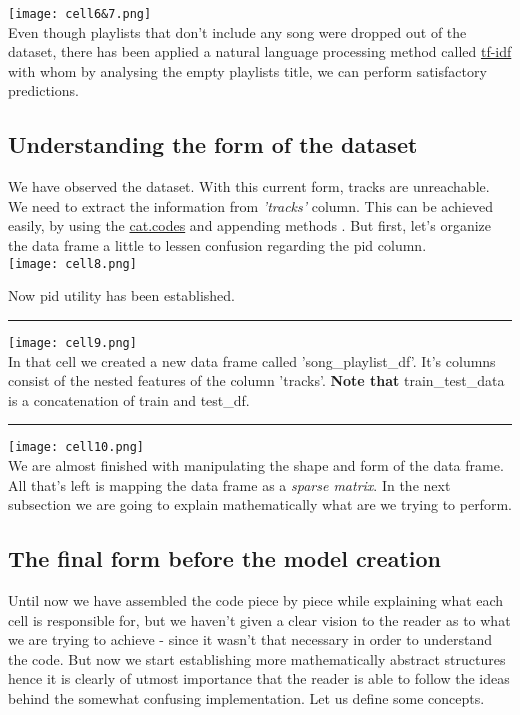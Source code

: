 \documentclass[]{article}
\begin{document}
\texttt{[image: cell6\&7.png]}
\\
Even though playlists that don't include any song were dropped out of the dataset, there has been applied a natural language processing method called \href{https://monkeylearn.com/blog/what-is-tf-idf/}{tf-idf} with whom by analysing the empty playlists title, we can perform satisfactory predictions.
\subsection{Understanding the form of the dataset}
We have observed the dataset. With this current form, tracks are unreachable. We need to extract the information from \textit{'tracks'} column. This can be achieved easily, by using the \href{https://stackoverflow.com/questions/30510562/get-mapping-of-categorical-variables-in-pandas/30513726}{cat.codes} and appending methods . But first, let's organize the data frame a little to lessen confusion regarding the pid column. 
\\
\texttt{[image: cell8.png]}

Now pid utility has been established.
\\
\noindent
{\color{Blue} \rule{\linewidth}{0.5mm}}
\texttt{[image: cell9.png]}
\\
In that cell we created a new data frame called 'song\_playlist\_df'. It's columns consist of the nested features of the column 'tracks'. \textbf{Note that} train\_test\_data is a concatenation of train and test\_df. 
\\ 
\noindent
{\color{Blue} \rule{\linewidth}{0.5mm}}
\texttt{[image: cell10.png]}
\\
We are almost finished with manipulating the shape and form of the data frame. All that's left is mapping the data frame as a \textit{sparse matrix}. In the next subsection we are going to explain mathematically what are we trying to perform.

\subsection{The final form before the model creation}

Until now we have assembled the code piece by piece while explaining what each cell is responsible for, but we haven't given a clear vision to the reader as to what we are trying to achieve - since it wasn't that necessary in order to understand the code. But now we start establishing more mathematically abstract structures hence it is clearly of utmost importance that the reader is able to follow the ideas behind the somewhat confusing implementation. Let us define some concepts. 
\end{document}
